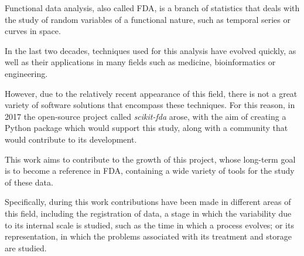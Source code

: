 Functional data analysis, also called FDA, is a branch of statistics that deals
with the study of random variables of a functional nature, such as temporal
series or curves in space.

In the last two decades, techniques used for this analysis have evolved quickly,
as well as their applications in many fields such as medicine, bioinformatics
or engineering.

However, due to the relatively recent appearance of this field, there is not a
great variety of software solutions that encompass these techniques. For this
reason, in 2017 the open-source project called \textit{scikit-fda} arose, with the aim of
creating a Python package which would support this study, along with a
community that would contribute to its development.

This work aims to contribute to the growth of this project, whose long-term goal
is to become a reference in FDA, containing a wide variety of tools for the
study of these data.

Specifically, during this work contributions have been made in different areas
of this field, including the registration of data, a stage in which the
variability due to its internal scale is studied, such as the time in which a
process evolves; or its representation, in which the problems associated with
its treatment and storage are studied.
